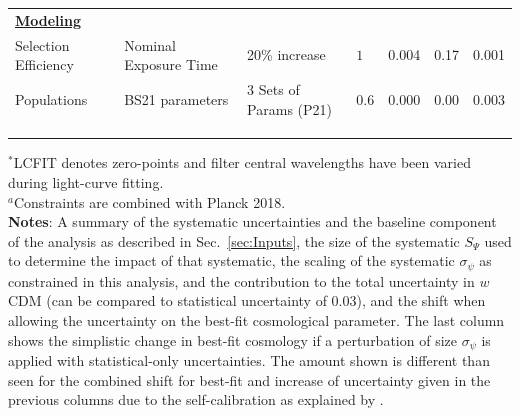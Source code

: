 \begin{table}
\begin{tabular}{llllccc}
\textbf{\ul{Modeling}}\\

Selection Efficiency & Nominal Exposure Time & 20\% increase & $1$ &0.004&0.17&0.001\\
Populations & BS21 parameters &  3 Sets of Params (P21) & $0.6$  &0.000&0.00&0.003 \\

\\

\toprule\\
\label{Tab:inputsys}
\vspace{-4mm}
\end{tabular}
{\raggedright
$^*$LCFIT denotes zero-points and filter central wavelengths have been varied during light-curve fitting.\\
$^a$Constraints are combined with Planck 2018.\\
\textbf{Notes}: A summary of the systematic uncertainties and the baseline component of the analysis as described in Sec.~\ref{sec:Inputs}, the size of the systematic $S_\Psi$ used to determine the impact of that systematic, the scaling of the systematic $\sigma_\psi$ as constrained in this analysis, and the contribution to the total uncertainty in $w$CDM (can be compared to statistical uncertainty of 0.03), and the shift when allowing the uncertainty on the best-fit cosmological parameter.  The last column shows the simplistic change in best-fit cosmology if a perturbation of size $\sigma_\psi$ is applied with statistical-only uncertainties.  The amount shown is different than seen for the combined shift for best-fit and increase of uncertainty given in the previous columns due to the self-calibration as explained by \cite{binning21}.   \\ 
\vspace{26mm}
}
\end{table}



